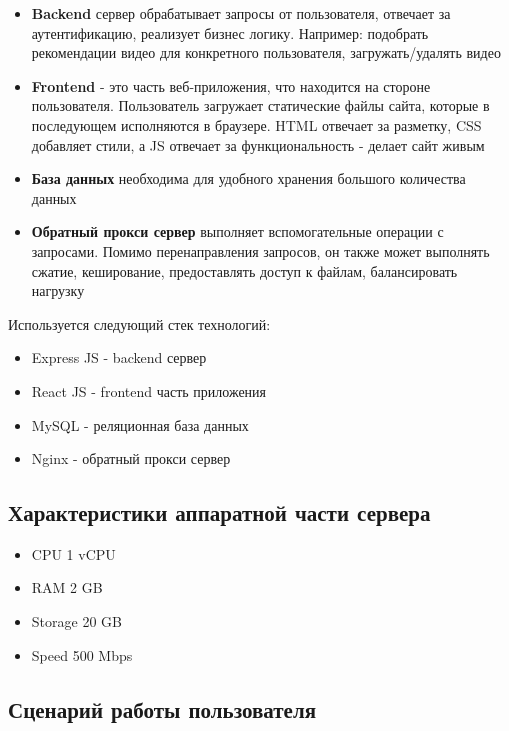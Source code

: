 \documentclass[12pt]{article}
\begin{document}
\begin{itemize}
    \item \textbf{Backend} сервер обрабатывает запросы от пользователя, отвечает за аутентификацию,
          реализует бизнес логику. Например: подобрать рекомендации видео для конкретного пользователя, загружать/удалять видео
    \item \textbf{Frontend} - это часть веб-приложения, что находится на стороне пользователя.
          Пользователь загружает статические файлы сайта, которые в последующем исполняются в браузере.
          HTML отвечает за разметку, CSS добавляет стили, а JS отвечает за функциональность - делает сайт живым
    \item \textbf{База данных} необходима для удобного хранения большого количества данных
    \item \textbf{Обратный прокси сервер} выполняет вспомогательные операции с запросами.
          Помимо перенаправления запросов, он также может выполнять сжатие, кеширование, предоставлять доступ к файлам,
          балансировать нагрузку
\end{itemize}

Используется следующий стек технологий:

\begin{itemize}
    \item Express JS - backend сервер
    \item React JS - frontend часть приложения
    \item MySQL - реляционная база данных
    \item Nginx - обратный прокси сервер
\end{itemize}

\subsection{Характеристики аппаратной части сервера}

\begin{itemize}
    \item CPU 1 vCPU
    \item RAM 2 GB
    \item Storage 20 GB
    \item Speed 500 Mbps
\end{itemize}

\subsection{Сценарий работы пользователя}
\end{document}
